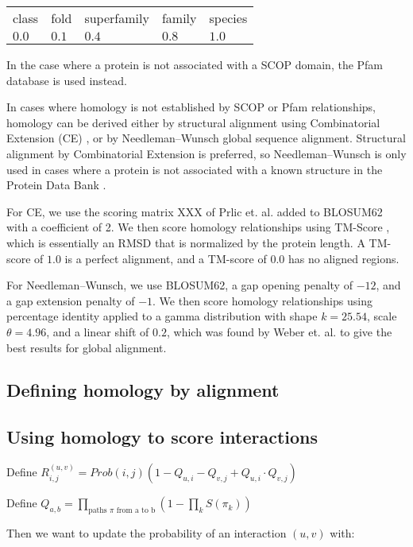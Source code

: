 \documentclass[12pt,twoside]{article}
\def\NI{\noindent}
\def\RS{
	\setlength{\itemsep}{0em}
	\setlength{\parskip}{0.4em}
	\setlength{\parsep}{0em}
}
\begin{document}
\begin{tabular}{lllll}
class & fold & superfamily & family & species \\
$0.0$ & $0.1$ & $0.4$ & $0.8$ & $1.0$ \\
\end{tabular}

\NI In the case where a protein is not associated with a SCOP domain, the Pfam database is used instead. \RS
\NI In cases where homology is not established by SCOP \cite{scop} or Pfam relationships, homology can be derived either by structural alignment using Combinatorial Extension (CE) \cite{ce}, or by Needleman--Wunsch \cite{needleman} global sequence alignment. Structural alignment by Combinatorial Extension is preferred, so Needleman--Wunsch is only used in cases where a protein is not associated with a known structure in the Protein Data Bank \cite{pdb}.

\NI For CE, we use the scoring matrix XXX of Prlic et. al. \cite{prlic} added to BLOSUM62 \cite{blosum} with a coefficient of 2. We then score homology relationships using TM-Score \cite{zhang}, which is essentially an RMSD that is normalized by the protein length. A TM-score of $1.0$ is a perfect alignment, and a TM-score of $0.0$ has no aligned regions.

\NI For Needleman--Wunsch, we use BLOSUM62, a gap opening penalty of $-12$, and a gap extension penalty of $-1$. We then score homology relationships using percentage identity applied to a gamma distribution with shape $k=25.54$, scale $\theta=4.96$, and a linear shift of $0.2$, which was found by Weber et. al. \cite{webber} to give the best results for global alignment.

\subsection{Defining homology by alignment}

\subsection{Using homology to score interactions}

Define
$R_{i,j}^{(u,v)} = Prob(i,j) \left(1 - \displaystyle Q_{u,i} - Q_{v,j} + Q_{u,i} \cdot Q_{v,j} \right)$

\NI Define $Q_{a,b} = \displaystyle \prod_{\text{paths } \pi \text{ from a to b}} \left( 1 - \prod_{k} S(\pi_k) \right)$

\NI Then we want to update the probability of an interaction $(u,v)$ with:
\end{document}
